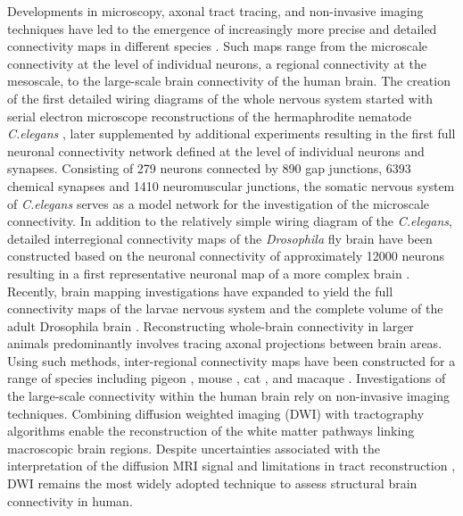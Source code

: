 Developments in microscopy, axonal tract tracing, and non-invasive imaging techniques have led to the emergence of increasingly more precise and detailed connectivity maps in different species \citep{Bota2015,Chiang2011a,Oh2014,Scannell1999,Shanahan2013,Stephan2001,VanEssen2013,White1986}. Such maps range from the microscale connectivity at the level of individual neurons, a regional connectivity at the mesoscale, to the large-scale brain connectivity of the human brain. The creation of the first detailed wiring diagrams of the whole nervous system started with serial electron microscope reconstructions of the hermaphrodite nematode \textit{C.elegans} \citep{White1986}, later supplemented by additional experiments \citep{Varshney2011} resulting in the first full neuronal connectivity network defined at the level of individual neurons and synapses. Consisting of 279 neurons connected by 890 gap junctions, 6393 chemical synapses and 1410 neuromuscular junctions, the somatic nervous system of \textit{C.elegans} serves as a model network for the investigation of the microscale connectivity. In addition to the relatively simple wiring diagram of the \textit{C.elegans}, detailed interregional connectivity maps of the \textit{Drosophila} fly brain have been constructed based on the neuronal connectivity of approximately \num{12000} neurons resulting in a first representative neuronal map of a more complex brain \citep{Chiang2011a}. Recently, brain mapping investigations have expanded to yield the full connectivity maps of the larvae nervous system \citep{Ohyama2015} and the complete volume of the adult Drosophila brain \citep{Zheng2018}. Reconstructing whole-brain connectivity in larger animals predominantly involves tracing axonal projections between brain areas. Using such methods, inter-regional connectivity maps have been constructed for a range of species including pigeon \citep{Shanahan2013}, mouse \citep{Oh2014}, cat \citep{Scannell1995}, and macaque \citep{Harriger2012}. Investigations of the large-scale connectivity within the human brain rely on non-invasive imaging techniques. Combining diffusion weighted imaging (DWI) with tractography algorithms \citep{Jbabdi2011} enable the reconstruction of the white matter pathways linking macroscopic brain regions. Despite uncertainties associated with the interpretation of the diffusion MRI signal and limitations in tract reconstruction \citep{Jones2010,Jones2013,Thomas2014}, DWI remains the most widely adopted technique to assess structural brain connectivity in human.

